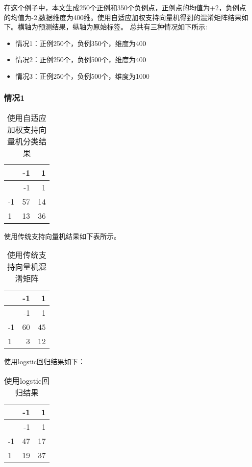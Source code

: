 \documentclass[
]{ctexart}
\providecommand{\tightlist}{%
  \setlength{\itemsep}{0pt}\setlength{\parskip}{0pt}}
\begin{document}
在这个例子中，本文生成250个正例和350个负例点，正例点的均值为+2，负例点的均值为-2,数据维度为400维。使用自适应加权支持向量机得到的混淆矩阵结果如下。横轴为预测结果，纵轴为原始标签。
总共有三种情况如下所示:

\begin{itemize}
\tightlist
\item
  情况1：正例250个，负例350个，维度为400
\item
  情况2：正例250个，负例500个，维度为400
\item
  情况3：正例250个，负例500个，维度为1000
\end{itemize}

\hypertarget{ux60c5ux51b51}{%
\subsubsection{情况1}\label{ux60c5ux51b51}}

\begin{longtable}[]{@{}lrr@{}}
\caption{使用自适应加权支持向量机分类结果}\tabularnewline
\toprule
& -1 & 1 \\
\midrule
\endfirsthead
\toprule
& -1 & 1 \\
\midrule
\endhead
-1 & 57 & 14 \\
1 & 13 & 36 \\
\bottomrule
\end{longtable}

使用传统支持向量机结果如下表所示。

\begin{longtable}[]{@{}lrr@{}}
\caption{使用传统支持向量机混淆矩阵}\tabularnewline
\toprule
& -1 & 1 \\
\midrule
\endfirsthead
\toprule
& -1 & 1 \\
\midrule
\endhead
-1 & 60 & 45 \\
1 & 3 & 12 \\
\bottomrule
\end{longtable}

使用logstic回归结果如下：

\begin{longtable}[]{@{}lrr@{}}
\caption{使用logstic回归结果}\tabularnewline
\toprule
& -1 & 1 \\
\midrule
\endfirsthead
\toprule
& -1 & 1 \\
\midrule
\endhead
-1 & 47 & 17 \\
1 & 19 & 37 \\
\bottomrule
\end{longtable}
\end{document}
